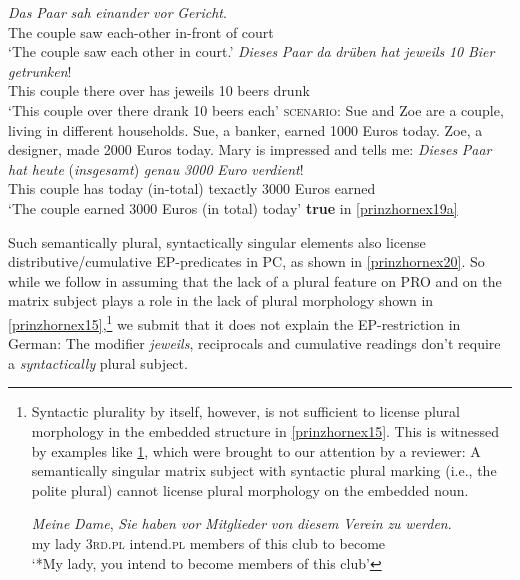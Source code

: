 \documentclass[output=paper,colorlinks,citecolor=brown,
]{langscibook}
\begin{document}
\ea \label{prinzhornex18} 
\ea 
\gll \textit{Das} \textit{Paar} \textit{sah} \textit{einander} \textit{vor} \textit{Gericht}.\\
  The couple saw each-other in-front of  court \\
\glt `The couple saw each other in court.' \label{prinzhornex18a}
\ex   \gll \textit{Dieses} \textit{Paar} \textit{da} \textit{dr\"{u}ben} \textit{hat} \textit{jeweils} \textit{10} \textit{Bier} \textit{getrunken}! \\
  This couple there over has jeweils 10 beers drunk\\
\glt `This couple over there drank 10 beers each'  \label{prinzhornex18b}
\ex  \textsc{scenario:} Sue and Zoe are a couple, living in different households. Sue, a banker, earned 1000 Euros today. Zoe, a designer, made 2000 Euros today. Mary is impressed and tells me: \label{prinzhornex19a}
\ex \gll \textit{Dieses} \textit{Paar} \textit{hat} \textit{heute} (\textit{insgesamt}) \textit{genau} \textit{3000} \textit{Euro} \textit{verdient}!\\
This couple has today (in-total) texactly 3000 Euros earned \\
\glt `The couple earned 3000 Euros (in total) today' \label{prinzhornex19b}\phantom{.}\hfill \textbf{true} in \ref{prinzhornex19a}
\z\z

Such semantically plural, syntactically singular elements also license distributive/cumulative EP-predicates in PC, as shown in \ref{prinzhornex20}. So while we follow \cite{Landau:2000} in assuming that the lack of a plural feature on PRO and  on the matrix subject plays a role in the lack of plural morphology shown in \ref{prinzhornex15},\footnote{Syntactic plurality by itself, however, is not sufficient to license plural morphology in the embedded structure in \ref{prinzhornex15}. This is witnessed by examples like \ref{prinzhorndame}, which were brought to our attention by a reviewer: A  semantically singular matrix subject with syntactic plural marking (i.e., the polite plural) cannot license plural morphology on the embedded noun.


\ea	 \gll  *\textit{Meine} \textit{Dame}, \textit{Sie} \textit{haben vor} \textit{Mitglieder} \textit{von} \textit{diesem} \textit{Verein} \textit{zu} \textit{werden}.\\
   my lady \textsc{3rd}.\textsc{pl}  intend.\textsc{pl} members of this club to become \\
\glt  `*My lady, you intend to become members of this club'\label{prinzhorndame}
\z

} we submit that it does not explain the EP-restriction in German: The modifier {\it jeweils}, reciprocals and cumulative readings don't require a \textit{syntactically} plural subject.
\end{document}
